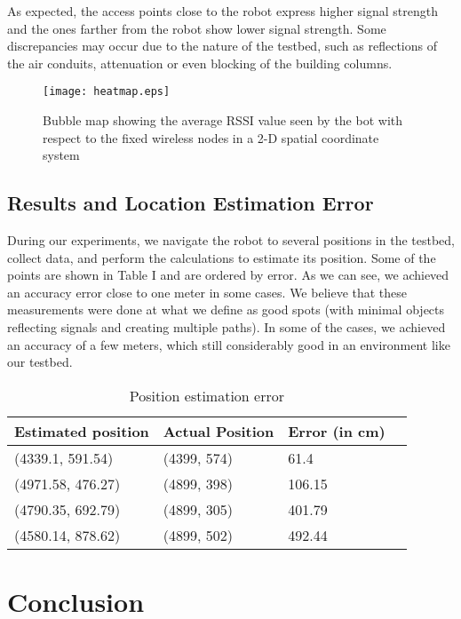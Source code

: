 \documentclass[journal]{IEEEtran} 				\IEEEoverridecommandlockouts 						\usepackage{amsmath,amssymb}
\begin{document}
As expected, the access points close to the robot express higher signal strength and the ones farther from the robot show lower signal strength. Some discrepancies may occur due to the nature of the testbed, such as reflections of the air conduits, attenuation or even blocking of the building columns.

\begin{figure}
\centering
\texttt{[image: heatmap.eps]}
\caption{Bubble map showing the average RSSI value seen by the bot with respect to the fixed wireless nodes in a 2-D spatial coordinate system}
\label{fig:bubblemap}
\end{figure}



\subsection{Results and Location Estimation Error}\label{sec:error}
During our experiments, we navigate the robot to several positions in the testbed, collect data, and perform the calculations to estimate its position. Some of the points are shown in Table I and are ordered by error. As we can see, we achieved an accuracy error close to one meter in some cases. We believe that these measurements were done at what we define as good spots (with minimal objects reflecting signals and creating multiple paths). In some of the cases, we achieved an accuracy of a few meters, which still considerably good in an environment like our testbed.

\begin{table}[]
\centering
\caption{Position estimation error}
\label{my-label}
\begin{tabular}{llll}
\hline
Estimated position & Actual Position & Error (in cm)\\
\hline
(4339.1, 591.54)		& (4399, 574) & 61.4	\\
(4971.58, 476.27)		& (4899, 398) & 106.15	\\
(4790.35, 692.79)		& (4899, 305) & 401.79	\\
(4580.14, 878.62)		& (4899, 502) & 492.44	\\
\hline
\end{tabular}
\end{table}


\section{Conclusion}\label{sec:conclude}
\end{document}
